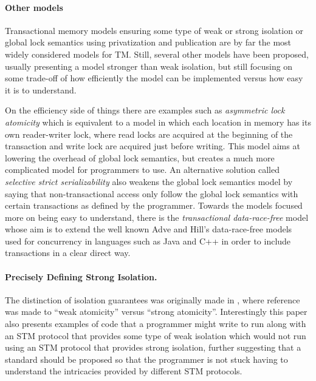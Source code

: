 \paragraph{Other models}
Transactional memory models ensuring some type of weak or strong isolation or
global lock semantics using privatization and publication are by far the most
widely considered models for TM.
Still, several other models have been proposed, usually presenting a model
stronger than weak isolation, but still focusing on some
trade-off of how efficiently the model can be implemented versus how easy
it is to understand.

On the efficiency side of things there are examples such as \emph{asymmetric lock atomicity} \cite{MBS08}
which is equivalent to a model in which each location in memory has its own
reader-writer lock, where read locks are acquired at the beginning of the transaction
and write lock are acquired just before writing.
This model aims at lowering the overhead of global lock semantics, but creates a much more complicated
model for programmers to use.
An alternative solution called \emph{selective strict serializability} \cite{spear08} also weakens the global lock
semantics model by saying that non-transactional access only follow the global lock semantics
with certain transactions as defined by the programmer.
Towards the models focused more on being easy to understand, there is the \emph{transactional data-race-free}
model \cite{DS09} whose aim is to extend the well known Adve and Hill's data-race-free models \cite{AH93} used for concurrency in
languages such as Java and C++ in order to include transactions in a clear direct way.


\paragraph{Precisely Defining Strong Isolation.}

The  distinction  of isolation guarantees  was  originally  made  in
\cite{blundell06},  where   reference  was  made   to  {}``weak
atomicity'' versus {}``strong atomicity''.
Interestingly this paper also presents examples of code that a programmer
might write to run along with an STM protocol that provides some type of weak
isolation which would not run using an STM protocol that provides strong isolation,
further suggesting that a standard should be proposed so that the programmer
is not stuck having to understand the intricacies provided by different STM
protocols.

